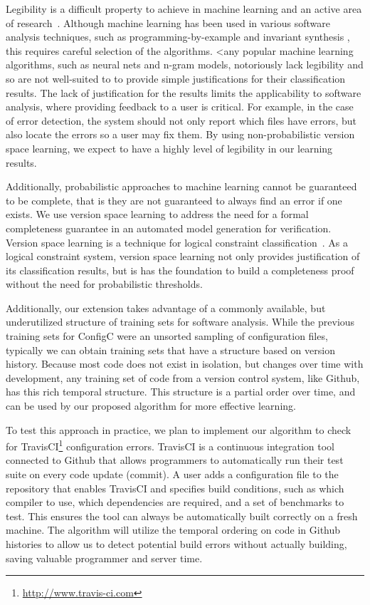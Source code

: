 Legibility is a difficult property to achieve in machine learning and an active area of research~\cite{lei2016rationalizing}.
Although machine learning has been used in various software analysis techniques, such as programming-by-example \cite{lau2000version} and invariant synthesis \cite{garg2014ice}, this requires careful selection of the algorithms.
<any popular machine learning algorithms, such as neural nets and n-gram models, notoriously lack legibility and so are not well-suited to to provide simple justifications for their classification results.
The lack of justification for the results limits the applicability to software analysis, where providing feedback to a user is critical.
For example, in the case of error detection, the system should not only report which files have errors, but also locate the errors so a user may fix them.
By using non-probabilistic version space learning, we expect to have a highly level of legibility in our learning results.

Additionally, probabilistic approaches to machine learning cannot be guaranteed to be complete, that is they are not guaranteed to always find an error if one exists.
We use version space learning to address the need for a formal completeness guarantee in an automated model generation for verification.
Version space learning is a technique for logical constraint classification~\cite{mitchell82}.
As a logical constraint system, version space learning not only provides justification of its classification results, but is has the foundation to build a completeness proof without the need for probabilistic thresholds.

Additionally, our extension takes advantage of a commonly available, but underutilized structure of training sets for software analysis.
While the previous training sets for ConfigC were an unsorted sampling of configuration files, typically we can obtain training sets that have a structure based on version history.
Because most code does not exist in isolation, but changes over time with development, any training set of code from a version control system, like Github, has this rich temporal structure. 
This structure is a partial order over time, and can be used by our proposed algorithm for more effective learning.


To test this approach in practice, we plan to implement our algorithm to check for TravisCI\footnote{\url{http://www.travis-ci.com}} configuration errors.
TravisCI is a continuous integration tool connected to Github that allows programmers to automatically run their test suite on every code update (commit).
A user adds a configuration file to the repository that enables TravisCI and specifies build conditions, such as which compiler to use, which dependencies are required, and a set of benchmarks to test.
This ensures the tool can always be automatically built correctly on a fresh machine.
The algorithm will utilize the temporal ordering on code in Github histories to allow us to detect potential build errors without actually building, saving valuable programmer and server time.

